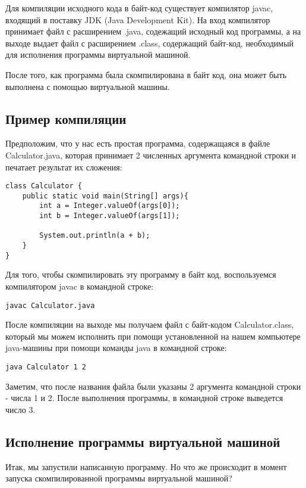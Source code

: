 \documentclass[]{scrartcl}
\begin{document}
Для компиляции исходного кода в байт-код существует компилятор javac, входящий в поставку JDK (Java Development Kit). На вход компилятор принимает файл с расширением .java, содежащий исходный код программы, а на выходе выдает файл с расширением .class, содержащий байт-код, необходимый для исполнения программы виртуальной машиной.

После того, как программа была скомпилирована в байт код, она может быть выполнена с помощью виртуальной машины.

\subsection{Пример компиляции}

Предположим, что у нас есть простая программа, содержащаяся в файле Calculator.java, которая принимает 2 численных аргумента командной строки и печатает результат их сложения:

\begin{lstlisting}
class Calculator {
	public static void main(String[] args){
		int a = Integer.valueOf(args[0]);
		int b = Integer.valueOf(args[1]);

		System.out.println(a + b);
	}
}
\end{lstlisting}

Для того, чтобы скомпилировать эту программу в байт код, воспользуемся компилятором javac в командной строке:

\begin{lstlisting}
javac Calculator.java
\end{lstlisting}

После компиляции на выходе мы получаем файл с байт-кодом Calculator.class, который мы можем исполнить при помощи установленной на нашем компьютере java-машины при помощи команды java в командной строке:

\begin{lstlisting}
java Calculator 1 2
\end{lstlisting}

Заметим, что после названия файла были указаны 2 аргумента командной строки - числа 1 и 2. После выполнения программы, в командной строке выведется число 3.

\subsection{Исполнение программы виртуальной машиной}

Итак, мы запустили написанную программу. Но что же происходит в момент запуска скомпилированной программы виртуальной машиной?
\end{document}
